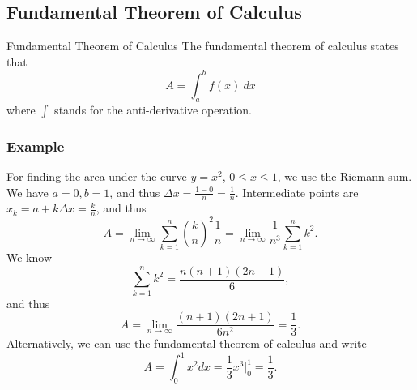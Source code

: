 \documentclass[letterpaper,10pt,twoside,twocolumn,openany]{book}
\begin{document}
\subsection{Fundamental Theorem of Calculus}
\begin{paperbox}{Fundamental Theorem of Calculus}
    The fundamental theorem of calculus states that
    \[ A = \int_a^b f(x)\ dx \]
    where $\int$ stands for the anti-derivative operation.
\end{paperbox}
\subsubsection*{Example}
For finding the area under the curve $y = x^2$, $0 \leq x \leq 1$, we use the Riemann sum. We have $a = 0, b = 1$, and thus $\Delta x = \frac{1 - 0}{n} = \frac{1}{n}$. 
Intermediate points are $x_k = a + k \Delta x = \frac{k}{n}$, and thus
\[ A = \lim_{n \rightarrow \infty} \sum_{k = 1}^n \left( \frac{k}{n} \right)^2 \frac{1}{n} = \lim_{n \rightarrow \infty} \frac{1}{n^3} \sum_{k = 1}^n k^2 . \]
We know
\[ \sum_{k = 1}^n k^2 = \frac{n ( n + 1) ( 2 n + 1)}{6}, \]
and thus
\[ A = \lim_{n \rightarrow \infty} \frac{( n + 1) ( 2 n + 1)}{6 n^2} =
   \frac{1}{3} . \]
Alternatively, we can use the fundamental theorem of calculus and write
\[ A = \int_0^1 x^2 dx = \frac{1}{3} x^3 |_0^1 = \frac{1}{3} . \]
\end{document}
